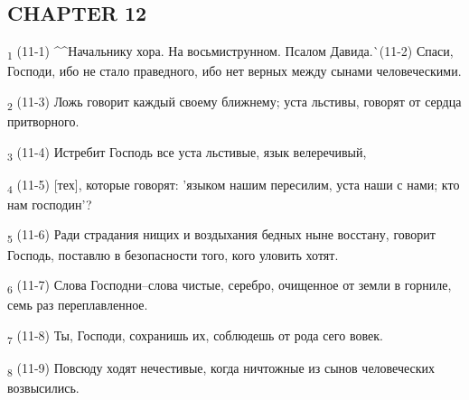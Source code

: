\subsection{CHAPTER 12}
\begin{tcolorbox}
\textsubscript{1} (11-1) ^^Начальнику хора. На восьмиструнном. Псалом Давида.^^ (11-2) Спаси, Господи, ибо не стало праведного, ибо нет верных между сынами человеческими.
\end{tcolorbox}
\begin{tcolorbox}
\textsubscript{2} (11-3) Ложь говорит каждый своему ближнему; уста льстивы, говорят от сердца притворного.
\end{tcolorbox}
\begin{tcolorbox}
\textsubscript{3} (11-4) Истребит Господь все уста льстивые, язык велеречивый,
\end{tcolorbox}
\begin{tcolorbox}
\textsubscript{4} (11-5) [тех], которые говорят: 'языком нашим пересилим, уста наши с нами; кто нам господин'?
\end{tcolorbox}
\begin{tcolorbox}
\textsubscript{5} (11-6) Ради страдания нищих и воздыхания бедных ныне восстану, говорит Господь, поставлю в безопасности того, кого уловить хотят.
\end{tcolorbox}
\begin{tcolorbox}
\textsubscript{6} (11-7) Слова Господни--слова чистые, серебро, очищенное от земли в горниле, семь раз переплавленное.
\end{tcolorbox}
\begin{tcolorbox}
\textsubscript{7} (11-8) Ты, Господи, сохранишь их, соблюдешь от рода сего вовек.
\end{tcolorbox}
\begin{tcolorbox}
\textsubscript{8} (11-9) Повсюду ходят нечестивые, когда ничтожные из сынов человеческих возвысились.
\end{tcolorbox}
